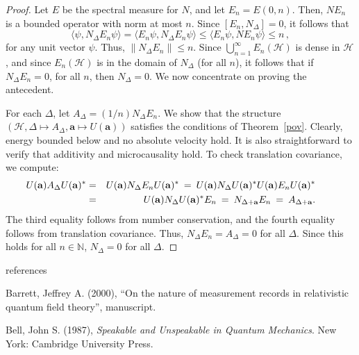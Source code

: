 \documentclass[11pt]{article}
\theoremstyle{remark}
\newcommand{\norm}[1]{\mbox{$\| #1\|$}}
\newcommand{\hil}[1]{\mathcal{#1}}
\begin{document}
\begin{appendix}
\begin{proof}
  Let $E$ be the spectral measure for $N$, and let $E_{n}=E(0,n)$.
  Then, $NE_{n}$ is a bounded operator with norm at most $n$.  Since
  $[E_{n},N_{\Delta}]=0$, it follows that \begin{equation} \langle
    \psi ,N_{\Delta}E_{n}\psi \rangle = \langle E_{n}\psi
    ,N_{\Delta}E_{n}\psi \rangle \leq \langle E_{n}\psi ,NE_{n}\psi
    \rangle \leq n \, ,\end{equation} for any unit vector $\psi$.
  Thus, $\norm{N_{\Delta}E_{n}}\leq n$.  Since $\bigcup
  _{n=1}^{\infty}E_{n}(\hil{H})$ is dense in $\hil{H}$, and since
  $E_{n}(\hil{H})$ is in the domain of $N_{\Delta}$ (for all $n$), it
  follows that if $N_{\Delta}E_{n}=0$, for all $n$, then
  $N_{\Delta}=0$.  We now concentrate on proving the antecedent.
  
  For each $\Delta$, let $A_{\Delta}=(1/n)N_{\Delta}E_{n}$.  We show
  that the structure $(\hil{H},\Delta \mapsto
  A_{\Delta},\mathbf{a}\mapsto U(\mathbf{a}))$ satisfies the
  conditions of Theorem~\ref{pov}.  Clearly, energy bounded below and
  no absolute velocity hold.  It is also straightforward to verify
  that additivity and microcausality hold.  To check translation
  covariance, we compute:
\begin{eqnarray}
\hspace{-2em} U(\mathbf{a})A_{\Delta}U(\mathbf{a})^{*} &=&
U(\mathbf{a})N_{\Delta}E_{n}U(\mathbf{a})^{*} \:=\: 
U(\mathbf{a})N_{\Delta}U(\mathbf{a})^{*}U(\mathbf{a})E_{n}U(\mathbf{a})^{*}
\\
&=& U(\mathbf{a})N_{\Delta}U(\mathbf{a})^{*}E_{n} \:=\: N_{\Delta
  +\mathbf{a}}E_{n} 
\:=\: A_{\Delta +\mathbf{a}}. \end{eqnarray}  
The third equality follows from number conservation, and the
fourth equality follows from translation covariance.
Thus, $N_{\Delta}E_{n}=A_{\Delta}=0$ for all $\Delta$.  Since this
holds for all $n\in \mathbb{N}$, $N_{\Delta}=0$ for
all $\Delta$.  \end{proof}

\end{appendix}

\newpage
\begin{center} {\sc references } \end{center}

Barrett, Jeffrey A. (2000), ``On the nature of
measurement records in relativistic quantum field theory'',
manuscript.

Bell, John S. (1987), {\it Speakable and Unspeakable in Quantum
  Mechanics}.  New York: Cambridge University Press.
\end{document}
